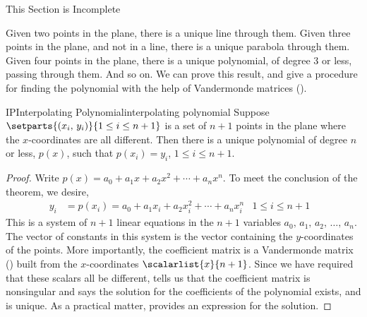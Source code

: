 %
{\sc\large This Section is Incomplete}\par\bigskip
%
Given two points in the plane, there is a unique line through them.  Given three points in the plane, and not in a line, there is a unique parabola through them.  Given four points in the plane, there is a unique polynomial, of degree 3 or less, passing through them.  And so on.  We can prove this result, and give a procedure for finding the polynomial with the help of Vandermonde matrices ().
%
\begin{theorem}{IP}{Interpolating Polynomial}{interpolating polynomial}
Suppose $\setparts{(x_i,\,y_i)}{1\leq i\leq n+1}$ is a set of $n+1$ points in the plane where the $x$-coordinates are all different.  Then there is a unique polynomial of degree $n$ or less, $p(x)$, such that $p(x_i)=y_i$, $1\leq i\leq n+1$.
\end{theorem}
%
\begin{proof}
Write $p(x)=a_0+a_1x+a_2x^2+\cdots+a_nx^n$.  To meet the conclusion of the theorem, we desire,
%
\begin{align*}
y_i&=p(x_i)=a_0+a_1x_i+a_2x_i^2+\cdots+a_nx_i^n
&
1\leq i\leq n+1&
\end{align*}
%
This is a system of $n+1$ linear equations in the $n+1$ variables $a_0,\,a_1,\,a_2,\,\ldots,\,a_n$.  The vector of constants in this system is the vector containing the $y$-coordinates of the points.   More importantly, the coefficient matrix is a Vandermonde matrix () built from the $x$-coordinates $\scalarlist{x}{n+1}$.  Since we have required that these scalars all be different,  tells us that the coefficient matrix is nonsingular and 
 says the solution for the coefficients of the polynomial exists, and is unique.  As a practical matter,  provides an expression for the solution.
%
\end{proof}
%
%

